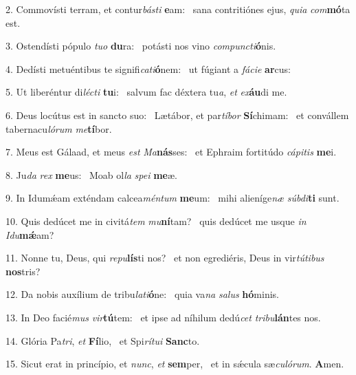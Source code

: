 2. Commovísti terram, et contur\textit{bás}\textit{ti} \textbf{e}am: \ast\  sana contritiónes ejus, \textit{qui}\textit{a} \textit{com}\textbf{mó}ta est.\

3. Ostendísti pópulo \textit{tu}\textit{o} \textbf{du}ra: \ast\  potásti nos vino \textit{com}\textit{punc}\textit{ti}\textbf{ó}nis.\

4. Dedísti metuéntibus te signifi\textit{ca}\textit{ti}\textbf{ó}nem: \ast\  ut fúgiant a \textit{fá}\textit{ci}\textit{e} \textbf{ar}cus:\

5. Ut liberéntur di\textit{léc}\textit{ti} \textbf{tu}i: \ast\  salvum fac déxtera tu\textit{a}, \textit{et} \textit{ex}\textbf{áu}di me.\

6. Deus locútus est in sancto suo: \dag\  Lætábor, et par\textit{tí}\textit{bor} \textbf{Sí}chimam: \ast\  et convállem tabernacu\textit{ló}\textit{rum} \textit{me}\textbf{tí}bor.\

7. Meus est Gálaad, et meus \textit{est} \textit{Ma}\textbf{nás}ses: \ast\  et Ephraim fortitúdo \textit{cá}\textit{pi}\textit{tis} \textbf{me}i.\

8. Ju\textit{da} \textit{rex} \textbf{me}us: \ast\  Moab ol\textit{la} \textit{spe}\textit{i} \textbf{me}æ.\

9. In Idumǽam exténdam calcea\textit{mén}\textit{tum} \textbf{me}um: \ast\  mihi alieníge\textit{næ} \textit{súb}\textit{di}\textbf{ti} sunt.\

10. Quis dedúcet me in civitá\textit{tem} \textit{mu}\textbf{ní}tam? \ast\  quis dedúcet me usque \textit{in} \textit{I}\textit{du}\textbf{mǽ}am?\

11. Nonne tu, Deus, qui \textit{re}\textit{pu}\textbf{lís}ti nos? \ast\  et non egrediéris, Deus in vir\textit{tú}\textit{ti}\textit{bus} \textbf{nos}tris?\

12. Da nobis auxílium de tribu\textit{la}\textit{ti}\textbf{ó}ne: \ast\  quia va\textit{na} \textit{sa}\textit{lus} \textbf{hó}minis.\

13. In Deo facié\textit{mus} \textit{vir}\textbf{tú}tem: \ast\  et ipse ad níhilum dedú\textit{cet} \textit{tri}\textit{bu}\textbf{lán}tes nos.\

14. Glória Pa\textit{tri}, \textit{et} \textbf{Fí}lio, \ast\  et Spi\textit{rí}\textit{tu}\textit{i} \textbf{Sanc}to.\

15. Sicut erat in princípio, et \textit{nunc}, \textit{et} \textbf{sem}per, \ast\  et in sǽcula sæ\textit{cu}\textit{ló}\textit{rum}. \textbf{A}men.\

